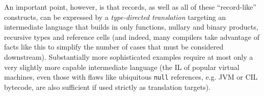 An important point, however, is that records, as well as all of these ``record-like'' constructs, can  be expressed by a \emph{type-directed translation} targeting an intermediate language that builds in only functions, nullary and binary products, recursive types and reference cells  \cite{pfpl} (and indeed, many compilers take advantage of facts like this to simplify the number of cases that must be considered downstream). %
Substantially more sophisticated examples require at most only a very slightly more capable intermediate language (the IL of popular virtual machines, even those with flaws like ubiquitous \texttt{null} references, e.g. JVM or CIL bytecode, are also sufficient if used strictly as translation targets).  %



